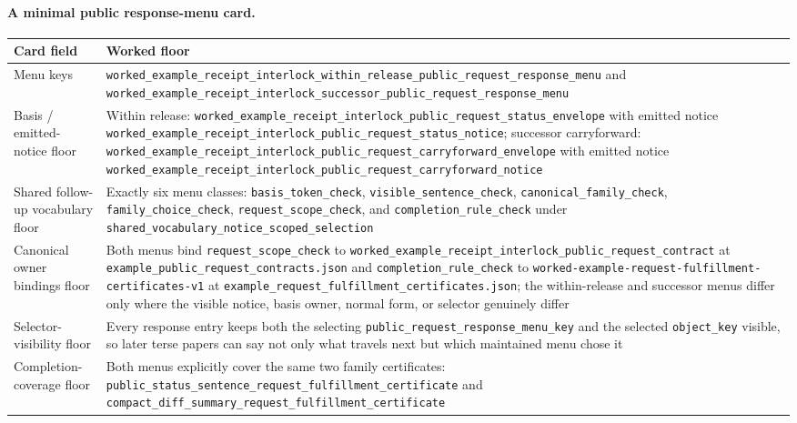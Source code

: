 \documentclass[11pt]{article}
\begin{document}
\paragraph{A minimal public response-menu card.}

\begin{table}[t]
\centering
\footnotesize
\begin{tabularx}{\linewidth}{@{}l X@{}}
\toprule
Card field & Worked floor \\
\midrule
Menu keys & \nolinkurl{worked_example_receipt_interlock_within_release_public_request_response_menu} and \nolinkurl{worked_example_receipt_interlock_successor_public_request_response_menu} \\
Basis / emitted-notice floor & Within release: \nolinkurl{worked_example_receipt_interlock_public_request_status_envelope} with emitted notice \nolinkurl{worked_example_receipt_interlock_public_request_status_notice}; successor carryforward: \nolinkurl{worked_example_receipt_interlock_public_request_carryforward_envelope} with emitted notice \nolinkurl{worked_example_receipt_interlock_public_request_carryforward_notice} \\
Shared follow-up vocabulary floor & Exactly six menu classes: \nolinkurl{basis_token_check}, \nolinkurl{visible_sentence_check}, \nolinkurl{canonical_family_check}, \nolinkurl{family_choice_check}, \nolinkurl{request_scope_check}, and \nolinkurl{completion_rule_check} under \nolinkurl{shared_vocabulary_notice_scoped_selection} \\
Canonical owner bindings floor & Both menus bind \nolinkurl{request_scope_check} to \nolinkurl{worked_example_receipt_interlock_public_request_contract} at \nolinkurl{example_public_request_contracts.json} and \nolinkurl{completion_rule_check} to \nolinkurl{worked-example-request-fulfillment-certificates-v1} at \nolinkurl{example_request_fulfillment_certificates.json}; the within-release and successor menus differ only where the visible notice, basis owner, normal form, or selector genuinely differ \\
Selector-visibility floor & Every response entry keeps both the selecting \nolinkurl{public_request_response_menu_key} and the selected \nolinkurl{object_key} visible, so later terse papers can say not only what travels next but which maintained menu chose it \\
Completion-coverage floor & Both menus explicitly cover the same two family certificates: \nolinkurl{public_status_sentence_request_fulfillment_certificate} and \nolinkurl{compact_diff_summary_request_fulfillment_certificate} \\

\end{tabularx}
\end{table}
\end{document}
